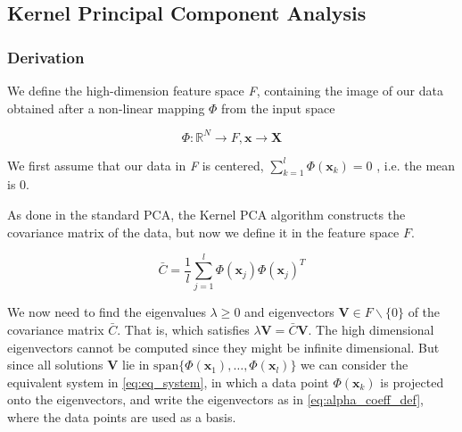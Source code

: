 \subsection{Kernel Principal Component Analysis}

\subsubsection{Derivation}
We define the high-dimension feature space \textit{F}, containing the image of our data obtained after a non-linear mapping $\Phi$ from the input space

\begin{equation} \label{eq:space_definition}
\Phi : \mathbb{R}^N \rightarrow F, \textbf{x} \rightarrow \textbf{X}
\end{equation}

We first assume that our data in \textit{F} is centered, $\sum\limits_{k=1}^l \Phi(\textbf{x}_k) = 0$ , i.e. the mean is 0.

As done in the standard PCA, the Kernel PCA algorithm constructs the covariance matrix of the data, but now we define it in the feature space $F$.

\begin{equation} \label{eq:cov_matrix}
\bar{C} = \frac{1}{l} \sum\limits_{j=1}^{l} \Phi(\textbf{x}_j) \Phi(\textbf{x}_j)^T
\end{equation}


We now need to find the eigenvalues $\lambda\geq 0$ and eigenvectors $\textbf{V}\in F \backslash\{ 0\}$ of the covariance matrix $\bar{C}$. That is, which satisfies $\lambda\textbf{V}=\bar{C}\textbf{V}$.
The high dimensional eigenvectors  cannot be computed since they might be infinite dimensional. But since all solutions $\textbf{V}$ lie in $\text{span}\{ \Phi(\textbf{x}_1),\dots,\Phi(\textbf{x}_l)\} $  we can consider the equivalent system in \eqref{eq:eq_system}, in which a data point $\Phi(\textbf{x}_k)$ is projected onto the eigenvectors, and write the eigenvectors as in \eqref{eq:alpha_coeff_def}, where the data points are used as a basis.


